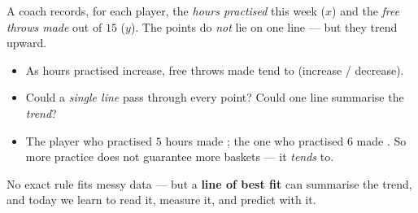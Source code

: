 \documentclass[10pt]{article}
\newcommand{\lgrid}[4]{%
  \draw[step=1, linegray!40, very thin] (#1,#3) grid (#2,#4);
  \draw[->, semithick, charcoal] (#1,0)--(#2,0) node[below right, font=\scriptsize]{$x$};
  \draw[->, semithick, charcoal] (0,#3)--(0,#4) node[left, font=\scriptsize]{$y$};}
\newcommand{\dpt}[2]{\fill[navy] (#1,#2) circle (2.6pt);}
\newcommand{\ftdata}{\dpt{1}{4}\dpt{2}{4}\dpt{3}{7}\dpt{4}{7}\dpt{5}{11}\dpt{6}{11}\dpt{7}{12}\dpt{8}{14}}
\begin{document}
\begin{hookbox}
A coach records, for each player, the \emph{hours practised} this week ($x$) and the \emph{free
throws made} out of $15$ ($y$). The points do \emph{not} lie on one line --- but they trend upward.
\begin{center}
\begin{minipage}[c]{0.40\linewidth}\centering
{}
\end{minipage}\hfill
\begin{minipage}[c]{0.56\linewidth}
\begin{itemize}\setlength{\itemsep}{2pt}
  \item As hours practised increase, free throws made tend to \blank{1.8cm} (increase / decrease).
  \item Could a \emph{single line} pass through every point? \blank{1.0cm} \; Could one line
        summarise the \emph{trend}? \blank{1.0cm}
  \item The player who practised $5$ hours made \blank{0.8cm}; the one who practised $6$ made
        \blank{0.8cm}. So more practice does not guarantee more baskets --- it \emph{tends} to.
\end{itemize}
\end{minipage}
\end{center}
No exact rule fits messy data --- but a \textbf{line of best fit} can summarise the trend, and
today we learn to read it, measure it, and predict with it.
\end{hookbox}
\end{document}
